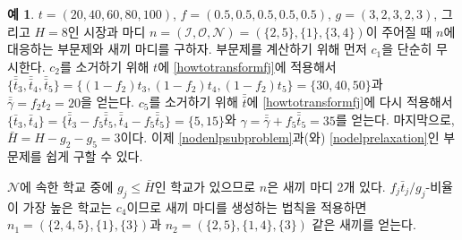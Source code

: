 \documentclass[11pt]{article} %
\newif\ifen
\theoremstyle{definition}
\newtheorem{example}{Example}
\theoremstyle{definition}
\newtheorem{example}{예}
\begin{document}
\begin{example}
\ifen
Consider a market in which $t = (20, 40, 60, 80, 100)$, $f = (0.5, 0.5, 0.5, 0.5, 0.5)$, $g = (3, 2, 3, 2, 3)$, and $H = 8$, and the node $n =  (\mathcal{I}, \mathcal{O}, \mathcal{N}) = (\{2, 5\}, \{1\}, \{3, 4\})$. Let us compute the two subproblems associated with $n$ and identify its children. To compute the subproblems, we first simply disregard $c_1$. Next, to eliminate $c_2$, we apply \eqref{howtotransformfj} to $t$ to obtain
$\{\bar{\bar t}_3, \bar{\bar t}_4, \bar{\bar t}_5\} = \{ (1 - f_2) t_3, (1 - f_2) t_4, (1 -f_2) t_5\} = \{30, 40, 50 \}$ and $\bar{\bar \gamma} = f_2 t_2 = 20$. We eliminate $c_5$ by again applying \eqref{howtotransformfj} to $\bar{ \bar t}$ to obtain $\{\bar t_3, \bar t_4\} =  \{\bar{\bar t}_3 - f_5 \bar{\bar t}_5, \bar{\bar t}_4-  f_5 \bar{\bar t}_5\}= \{5, 15\}$ and $\gamma = \bar{\bar \gamma} + f_5 \bar{\bar t}_5 = 35$. Finally, $\bar H = H - g_2 - g_5 = 3$. Now problems \eqref{nodenlpsubproblem} and \eqref{nodelprelaxation} are easily obtained by substitution.
\else
 $t = (20, 40, 60, 80, 100)$, $f = (0.5, 0.5, 0.5, 0.5, 0.5)$, $g = (3, 2, 3, 2, 3)$, 그리고 $H = 8$인 시장과 마디 $n =  (\mathcal{I}, \mathcal{O}, \mathcal{N}) = (\{2, 5\}, \{1\}, \{3, 4\})$이 주어질 때 $n$에 대응하는 부문제와 새끼 마디를 구하자. 부문제를 계산하기 위해 먼저 $c_1$을 단순히 무시한다.  $c_2$를 소거하기 위해 $t$에 \eqref{howtotransformfj}에 적용해서 
$\{\bar{\bar t}_3, \bar{\bar t}_4, \bar{\bar t}_5\} = \{ (1 - f_2) t_3, (1 - f_2) t_4, (1 -f_2) t_5\} = \{30, 40, 50 \}$과 $\bar{\bar \gamma} = f_2 t_2 = 20$을 얻는다. $c_5$를 소거하기 위해 $\bar{\bar t}$에 \eqref{howtotransformfj}에 다시 적용해서 $\{\bar t_3, \bar t_4\} =  \{\bar{\bar t}_3 - f_5 \bar{\bar t}_5, \bar{\bar t}_4-  f_5 \bar{\bar t}_5\}= \{5, 15\}$와 $\gamma = \bar{\bar \gamma} + f_5 \bar{\bar t}_5 = 35$를 얻는다. 마지막으로, $\bar H = H - g_2 - g_5 = 3$이다. 이제 \eqref{nodenlpsubproblem}과(와) \eqref{nodelprelaxation}인 부문제를 쉽게 구할 수 있다.
\fi

\ifen
Since at least one of the schools in $\mathcal{N}$ has $g_j \leq \bar H$, $n$ has two children. Applying the node-generation rule, $c_4$ has the highest $f_j \bar t_j / g_j$-ratio, so the children are $n_1 = (\{2, 4, 5\}, \{1\}, \{3\})$ and $n_2 = (\{2, 5\}, \{1, 4\}, \{3\})$.
\else
$\mathcal{N}$에 속한 학교 중에 $g_j \leq \bar H$인 학교가 있으므로 $n$은 새끼 마디 2개 있다. $f_j \bar t_j / g_j$-비율이 가장 높은 학교는 $c_4$이므로 새끼 마디를 생성하는 법칙을 적용하면 $n_1 = (\{2, 4, 5\}, \{1\}, \{3\})$과 $n_2 = (\{2, 5\}, \{1, 4\}, \{3\})$ 같은 새끼를 얻는다.
\fi
\end{example}
\end{document}
